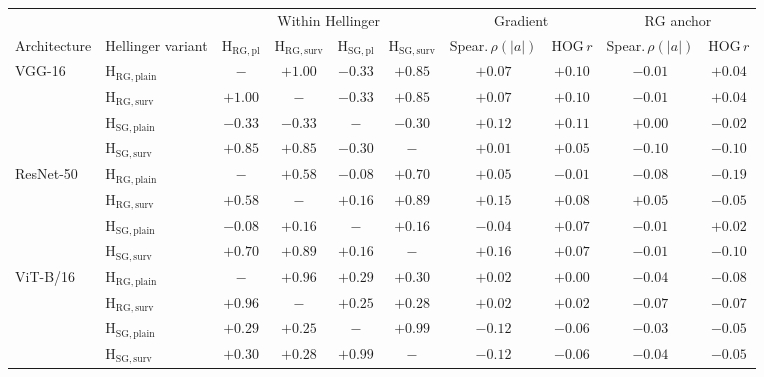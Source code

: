 \begin{tabular}{ll cccc cccc}
  \toprule
  & & \multicolumn{4}{c}{Within Hellinger} & \multicolumn{2}{c}{Gradient} & \multicolumn{2}{c}{$\mathrm{RG}$ anchor} \\
  \cmidrule(lr){3-6} \cmidrule(lr){7-8} \cmidrule(lr){9-10}
  Architecture & Hellinger variant
    & $\mathrm{H}_{\mathrm{RG,pl}}$ & $\mathrm{H}_{\mathrm{RG,surv}}$
    & $\mathrm{H}_{\mathrm{SG,pl}}$ & $\mathrm{H}_{\mathrm{SG,surv}}$
    & Spear.\,$\rho(|a|)$ & HOG\,$r$ & Spear.\,$\rho(|a|)$ & HOG\,$r$ \\
  \midrule
    \multirow{4}{*}{VGG-16} & $\mathrm{H}_{\mathrm{RG,plain}}$ & $-$     & $+1.00$ & $-0.33$ & $+0.85$ & $+0.07$ & $+0.10$ & $-0.01$ & $+0.04$ \\
                             & $\mathrm{H}_{\mathrm{RG,surv}}$ & $+1.00$ & $-$     & $-0.33$ & $+0.85$ & $+0.07$ & $+0.10$ & $-0.01$ & $+0.04$ \\
                             & $\mathrm{H}_{\mathrm{SG,plain}}$ & $-0.33$ & $-0.33$ & $-$     & $-0.30$ & $+0.12$ & $+0.11$ & $+0.00$ & $-0.02$ \\
                             & $\mathrm{H}_{\mathrm{SG,surv}}$ & $+0.85$ & $+0.85$ & $-0.30$ & $-$     & $+0.01$ & $+0.05$ & $-0.10$ & $-0.10$ \\
    \midrule
    \multirow{4}{*}{ResNet-50} & $\mathrm{H}_{\mathrm{RG,plain}}$ & $-$     & $+0.58$ & $-0.08$ & $+0.70$ & $+0.05$ & $-0.01$ & $-0.08$ & $-0.19$ \\
                             & $\mathrm{H}_{\mathrm{RG,surv}}$ & $+0.58$ & $-$     & $+0.16$ & $+0.89$ & $+0.15$ & $+0.08$ & $+0.05$ & $-0.05$ \\
                             & $\mathrm{H}_{\mathrm{SG,plain}}$ & $-0.08$ & $+0.16$ & $-$     & $+0.16$ & $-0.04$ & $+0.07$ & $-0.01$ & $+0.02$ \\
                             & $\mathrm{H}_{\mathrm{SG,surv}}$ & $+0.70$ & $+0.89$ & $+0.16$ & $-$     & $+0.16$ & $+0.07$ & $-0.01$ & $-0.10$ \\
    \midrule
    \multirow{4}{*}{ViT-B/16} & $\mathrm{H}_{\mathrm{RG,plain}}$ & $-$     & $+0.96$ & $+0.29$ & $+0.30$ & $+0.02$ & $+0.00$ & $-0.04$ & $-0.08$ \\
                             & $\mathrm{H}_{\mathrm{RG,surv}}$ & $+0.96$ & $-$     & $+0.25$ & $+0.28$ & $+0.02$ & $+0.02$ & $-0.07$ & $-0.07$ \\
                             & $\mathrm{H}_{\mathrm{SG,plain}}$ & $+0.29$ & $+0.25$ & $-$     & $+0.99$ & $-0.12$ & $-0.06$ & $-0.03$ & $-0.05$ \\
                             & $\mathrm{H}_{\mathrm{SG,surv}}$ & $+0.30$ & $+0.28$ & $+0.99$ & $-$     & $-0.12$ & $-0.06$ & $-0.04$ & $-0.05$ \\
  \bottomrule
\end{tabular}
